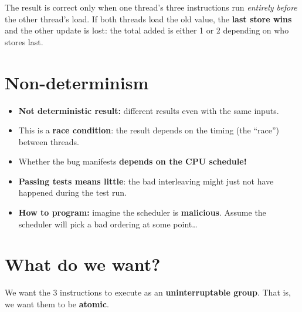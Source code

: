 \documentclass[11pt,a4paper]{article}
\begin{document}
\begin{keybox}[Pattern]
The result is correct only when one thread's three instructions run
\emph{entirely before} the other thread's load. If both threads load the
old value, the \textbf{last store wins} and the other update is lost: the
total added is either 1 or 2 depending on who stores last.
\end{keybox}

\section{Non-determinism}

\begin{defbox}
\begin{itemize}
  \item \textbf{Not deterministic result:} different results even with the
        same inputs.
  \item This is a \textbf{race condition}: the result depends on the timing
        (the ``race'') between threads.
\end{itemize}
\end{defbox}

\begin{itemize}
  \item Whether the bug manifests \textbf{depends on the CPU schedule!}
  \item \textbf{Passing tests means little}: the bad interleaving might
        just not have happened during the test run.
  \item \textbf{How to program:} imagine the scheduler is
        \textbf{malicious}. Assume the scheduler will pick a bad ordering at
        some point\ldots
\end{itemize}

\section{What do we want?}

We want the 3 instructions to execute as an \textbf{uninterruptable
group}. That is, we want them to be \textbf{atomic}.

\begin{center}
\end{center}
\end{document}
